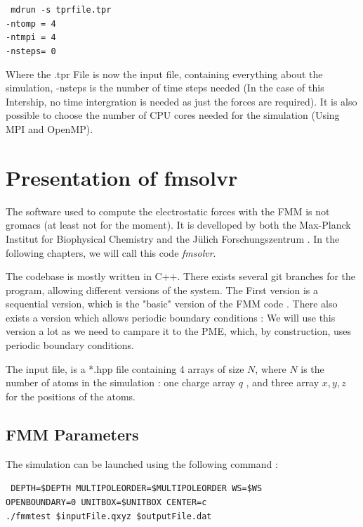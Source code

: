 \documentclass[12pt,twoside,a4paper]{report}
\begin{document}
{\centering\tt { mdrun -s tprfile.tpr \\
				 -ntomp = 4  			\\		
				 -ntmpi = 4				 \\
				 -nsteps= 0     		  \\  
 }}
 
\vspace{5mm}

Where the .tpr File is now the input file, containing everything about the simulation, -nsteps is the number of time steps needed (In the case of this Intership, no time intergration is needed as just the forces are required). It is also possible to choose the number of CPU cores needed for the simulation (Using MPI and OpenMP).

\section{Presentation of fmsolvr}	

	The software used to compute the electrostatic forces with the FMM is not gromacs (at least not for the moment). It is develloped by both the Max-Planck Institut for Biophysical Chemistry and the Jülich Forschungszentrum . In the following chapters, we will call this code \textit{fmsolvr}. 
	
	The codebase is mostly written in C++.  There exists several git branches for the program, allowing different versions of the system.	
The First version is a sequential version, which is the "basic" version of the FMM code . There also exists a version which allows periodic boundary conditions : We will use this version a lot as we need to campare it to the PME, which, by construction, uses periodic boundary conditions.	

The input file, is a *.hpp file containing 4 arrays of size $N$, where $N$ is the number of atoms in the simulation : one charge array $q$ , and three array $x,y,z$ for the positions of the atoms.

\subsection{FMM Parameters}

The simulation can be launched using the following command : 

{\centering\tt { DEPTH=\${DEPTH}  MULTIPOLEORDER=\${MULTIPOLEORDER}  WS=\${WS} \\ 
OPENBOUNDARY=0 UNITBOX=\${UNITBOX} CENTER=c \\
./fmmtest \$inputFile.qxyz \$outputFile.dat \\					
 }}
\end{document}
